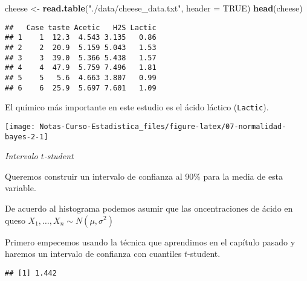 \documentclass[
  12pt,
]{book}
\newenvironment{Shaded}{\begin{snugshade}}{\end{snugshade}}
\newcommand{\DataTypeTok}[1]{\textcolor[rgb]{0.13,0.29,0.53}{#1}}
\newcommand{\KeywordTok}[1]{\textcolor[rgb]{0.13,0.29,0.53}{\textbf{#1}}}
\newcommand{\NormalTok}[1]{#1}
\newcommand{\OperatorTok}[1]{\textcolor[rgb]{0.81,0.36,0.00}{\textbf{#1}}}
\newcommand{\OtherTok}[1]{\textcolor[rgb]{0.56,0.35,0.01}{#1}}
\newcommand{\StringTok}[1]{\textcolor[rgb]{0.31,0.60,0.02}{#1}}
\begin{document}
\begin{Shaded}
\begin{Highlighting}[]
\NormalTok{cheese \textless{}{-}}\StringTok{ }\KeywordTok{read.table}\NormalTok{(}\StringTok{"./data/cheese\_data.txt"}\NormalTok{, }\DataTypeTok{header =} \OtherTok{TRUE}\NormalTok{)}
\KeywordTok{head}\NormalTok{(cheese)}
\end{Highlighting}
\end{Shaded}

\begin{verbatim}
##   Case taste Acetic   H2S Lactic
## 1    1  12.3  4.543 3.135   0.86
## 2    2  20.9  5.159 5.043   1.53
## 3    3  39.0  5.366 5.438   1.57
## 4    4  47.9  5.759 7.496   1.81
## 5    5   5.6  4.663 3.807   0.99
## 6    6  25.9  5.697 7.601   1.09
\end{verbatim}

El químico más importante en este estudio es el ácido láctico (\texttt{Lactic}).

\begin{Shaded}
\end{Shaded}

\begin{center}\texttt{[image: Notas-Curso-Estadistica\_files/figure-latex/07-normalidad-bayes-2-1]} \end{center}

\emph{Intervalo \(t\)-student}

Queremos construir un intervalo de confianza al 90\% para la media
de esta variable.

De acuerdo al histograma podemos asumir que las oncentraciones de ácido en queso
\(X_1,\dots, X_n\sim N(\mu,\sigma^2)\)

Primero empecemos usando la técnica que aprendimos en el capítulo pasado y
haremos un intervalo de confianza con cuantiles \(t\)-student.

\begin{Shaded}
\end{Shaded}

\begin{verbatim}
## [1] 1.442
\end{verbatim}
\end{document}
